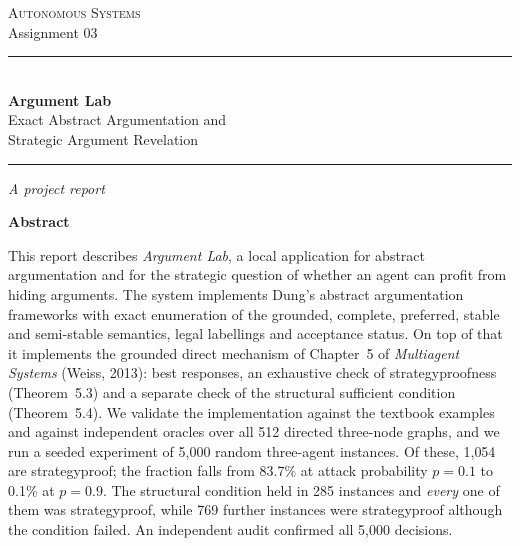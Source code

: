 \documentclass[11pt,a4paper]{article}
\begin{document}
\begin{titlepage}
\centering
\vspace*{0.5cm}

{\large\scshape Autonomous Systems}\\[0.3em]
{\large Assignment 03}

\vspace{1.0cm}
\rule{0.8\textwidth}{0.8pt}\\[1em]
{\fontsize{26}{32}\selectfont\bfseries Argument Lab}\\[0.7em]
{\Large Exact Abstract Argumentation and\\[0.3em]Strategic Argument Revelation}\\[1em]
\rule{0.8\textwidth}{0.8pt}

\vspace{0.6cm}
{\large\itshape A project report}

\vfill

\begin{minipage}{0.9\textwidth}
\centering\textbf{\large Abstract}\par\vspace{0.6em}
\small\raggedright\setlength{\parindent}{0pt}\setlength{\parskip}{0pt}
\noindent
This report describes \emph{Argument Lab}, a local application for abstract argumentation and for the strategic question of whether an agent can profit from hiding arguments. The system implements Dung's abstract argumentation frameworks with exact enumeration of the grounded, complete, preferred, stable and semi-stable semantics, legal labellings and acceptance status. On top of that it implements the grounded direct mechanism of Chapter~5 of \emph{Multiagent Systems} (Weiss, 2013): best responses, an exhaustive check of strategyproofness (Theorem~5.3) and a separate check of the structural sufficient condition (Theorem~5.4). We validate the implementation against the textbook examples and against independent oracles over all 512 directed three-node graphs, and we run a seeded experiment of 5{,}000 random three-agent instances. Of these, 1{,}054 are strategyproof; the fraction falls from 83.7\% at attack probability $p=0.1$ to 0.1\% at $p=0.9$. The structural condition held in 285 instances and \emph{every} one of them was strategyproof, while 769 further instances were strategyproof although the condition failed. An independent audit confirmed all 5{,}000 decisions.
\end{minipage}


\end{titlepage}
\end{document}
